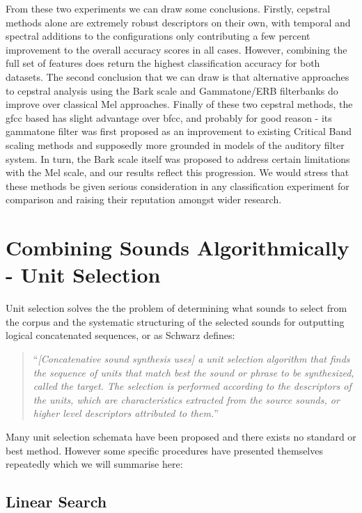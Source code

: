 {{{{{{{From these two experiments we can draw some conclusions. Firstly, cepstral methods alone are extremely robust descriptors on their own, with temporal and spectral additions to the configurations only contributing a few percent improvement to the overall accuracy scores in all cases. However, combining the full set of features does return the highest classification accuracy for both datasets. The second conclusion that we can draw is that alternative approaches to cepstral analysis using the Bark scale and Gammatone/ERB filterbanks do improve over classical Mel approaches.  Finally of these two cepstral methods, the \acrshort{gfcc} based has slight advantage over \acrshort{bfcc}, and probably for good reason - its gammatone filter was first proposed as an improvement to existing Critical Band scaling methods and supposedly more grounded in models of the auditory filter system. In turn, the Bark scale itself was proposed to address certain limitations with the Mel scale, and our results reflect this progression. We would stress that these methods be given serious consideration in any classification experiment for comparison and raising their reputation amongst wider research.

\section{Combining Sounds Algorithmically - Unit Selection}

Unit selection solves the the problem of determining what sounds to select from the corpus and the systematic structuring of the selected sounds for outputting logical concatenated sequences, or as Schwarz defines:

\blockcquote[]{Schwarz2006b}{``\textit{[Concatenative sound synthesis uses] a unit selection algorithm that finds the sequence of units that match best the sound or phrase to be synthesized, called the target. The selection is performed according to the descriptors of the units, which are characteristics extracted from the source sounds, or higher level descriptors attributed to them.}''} 

 Many unit selection schemata have been proposed and there exists no standard or best method. However some specific procedures have presented themselves repeatedly which we will summarise here:

\subsection{Linear Search}

}}}}}}}
